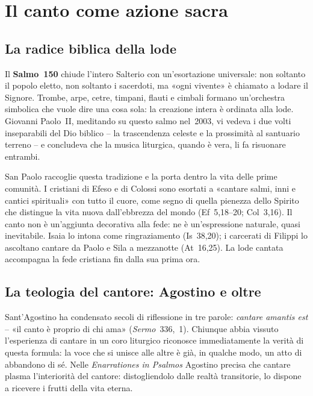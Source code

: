 \documentclass[12pt,a4paper]{article}
\begin{document}
	\newpage
	
	\section{Il canto come azione sacra}
	
	\subsection{La radice biblica della lode}
	
	Il \textbf{Salmo~150} chiude l'intero Salterio con un'esortazione universale:
	non soltanto il popolo eletto, non soltanto i sacerdoti, ma «ogni vivente» è
	chiamato a lodare il Signore. Trombe, arpe, cetre, timpani, flauti e cimbali
	formano un'orchestra simbolica che vuole dire una cosa sola: la creazione intera
	è ordinata alla lode. Giovanni Paolo~II, meditando su questo salmo nel~2003, vi
	vedeva i due volti inseparabili del Dio biblico -- la trascendenza celeste e la
	prossimità al santuario terreno -- e concludeva che la musica liturgica, quando
	è vera, li fa risuonare entrambi.
	
	San Paolo raccoglie questa tradizione e la porta dentro la vita delle prime
	comunità. I cristiani di Efeso e di Colossi sono esortati a «cantare salmi, inni
	e cantici spirituali» con tutto il cuore, come segno di quella pienezza dello
	Spirito che distingue la vita nuova dall'ebbrezza del mondo (Ef~5,18--20;
	Col~3,16). Il canto non è un'aggiunta decorativa alla fede: ne è
	un'espressione naturale, quasi inevitabile. Isaia lo intona come ringraziamento
	(Is~38,20); i carcerati di Filippi lo ascoltano cantare da Paolo e Sila a
	mezzanotte (At~16,25). La lode cantata accompagna la fede cristiana fin dalla
	sua prima ora.
	
	\subsection{La teologia del cantore: Agostino e oltre}
	
	Sant'Agostino ha condensato secoli di riflessione in tre parole:
	\emph{cantare amantis est} -- «il canto è proprio di chi ama»
	(\emph{Sermo}~336,~1). Chiunque abbia vissuto l'esperienza di cantare in un
	coro liturgico riconosce immediatamente la verità di questa formula: la voce
	che si unisce alle altre è già, in qualche modo, un atto di abbandono di sé.
	Nelle \emph{Enarrationes in Psalmos} Agostino precisa che cantare plasma
	l'interiorità del cantore: distogliendolo dalle realtà transitorie, lo dispone
	a ricevere i frutti della vita eterna.
	
\end{document}
